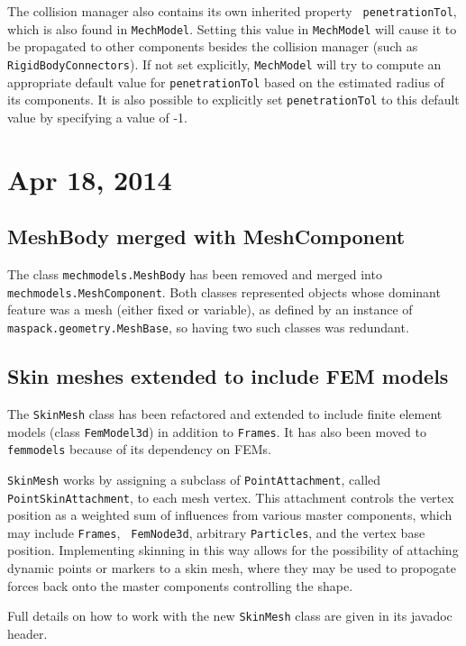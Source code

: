 \documentclass{article}
\begin{document}
The collision manager also contains its own inherited property {\tt
penetrationTol}, which is also found in {\tt MechModel}. Setting this
value in {\tt MechModel} will cause it to be propagated to other
components besides the collision manager (such as {\tt
RigidBodyConnectors}). If not set explicitly, {\tt MechModel} will try
to compute an appropriate default value for {\tt penetrationTol} based
on the estimated radius of its components.  It is also possible to
explicitly set {\tt penetrationTol} to this default value by
specifying a value of -1.

\section*{Apr 18, 2014}

\subsection*{MeshBody merged with MeshComponent}

The class {\tt mechmodels.MeshBody} has been removed and merged into
{\tt mechmodels.MeshComponent}. Both classes represented objects whose
dominant feature was a mesh (either fixed or variable), as defined by
an instance of {\tt maspack.geometry.MeshBase}, so having two such
classes was redundant.

\subsection*{Skin meshes extended to include FEM models}

The {\tt SkinMesh} class has been refactored and extended to include
finite element models (class {\tt FemModel3d}) in addition to {\tt Frames}.
It has also been moved to {\tt femmodels} because of its
dependency on FEMs.

{\tt SkinMesh} works by assigning a subclass of {\tt PointAttachment},
called {\tt PointSkinAttachment}, to each mesh vertex. This attachment
controls the vertex position as a weighted sum of influences from
various master components, which may include {\tt Frames}, {\tt
FemNode3d}, arbitrary {\tt Particles}, and the vertex base
position. Implementing skinning in this way allows for the possibility
of attaching dynamic points or markers to a skin mesh, where they may
be used to propogate forces back onto the master components
controlling the shape.

Full details on how to work with the new {\tt SkinMesh} class are
given in its javadoc header.
\end{document}
